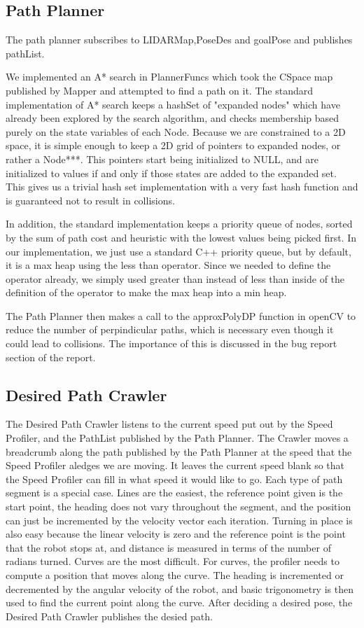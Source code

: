\documentclass{article}
\begin{document}
\subsection{Path Planner}

The path planner subscribes to LIDARMap,PoseDes and goalPose and publishes pathList.

We implemented an A* search in PlannerFuncs which took the CSpace map published by Mapper and attempted to find a path on it.
The standard implementation of A* search keeps a hashSet of "expanded nodes" which have already been explored by the search algorithm, and checks membership based purely on the state variables of each Node.  
Because we are constrained to a 2D space, it is simple enough to keep a 2D grid of pointers to expanded nodes, or rather a Node***. 
This pointers start being initialized to NULL, and are initialized to values if and only if those states are added to the expanded set.
This gives us a trivial hash set implementation with a very fast hash function and is guaranteed not to result in collisions.

In addition, the standard implementation keeps a priority queue of nodes, sorted by the sum of path cost and heuristic with the lowest values being picked first.
In our implementation, we just use a standard C++ priority queue, but by default, it is a max heap using the less than operator.
Since we needed to define the operator already, we simply used greater than instead of less than inside of the definition of the operator to make the max heap into a min heap.

The Path Planner then makes a call to the approxPolyDP function in openCV to reduce the number of perpindicular paths, which is necessary even though it could lead to collisions.
The importance of this is discussed in the bug report section of the report.

\subsection{Desired Path Crawler}

The Desired Path Crawler listens to the current speed put out by the Speed Profiler, and the PathList published by the Path Planner.
The Crawler moves a breadcrumb along the path published by the Path Planner at the speed that the Speed Profiler aledges we are moving.
It leaves the current speed blank so that the Speed Profiler can fill in what speed it would like to go.
Each type of path segment is a special case.
Lines are the easiest, the reference point given is the start point, the heading does not vary throughout the segment, and the position can just be incremented by the velocity vector each iteration.
Turning in place is also easy because the linear velocity is zero and the reference point is the point that the robot stops at, and distance is measured in terms of the number of radians turned.
Curves are the most difficult. 
For curves, the profiler needs to compute a position that moves along the curve. 
The heading is incremented or decremented by the angular velocity of the robot, and basic trigonometry is then used to find the current point along the curve.
After deciding a desired pose, the Desired Path Crawler publishes the desied path.
\end{document}
